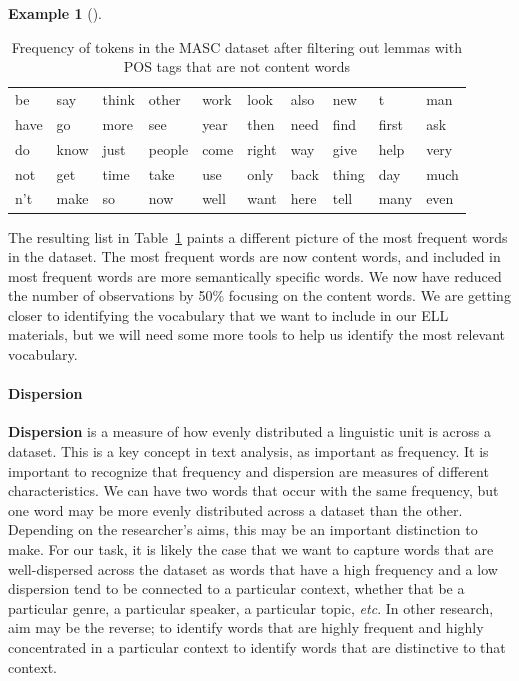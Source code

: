 \documentclass[
  letterpaper,
]{latex/krantz}
\let\oldparagraph\paragraph
\renewcommand{\paragraph}[1]{\oldparagraph{#1}\mbox{}}
\theoremstyle{definition}
\newtheorem{example}{Example}[chapter]
\theoremstyle{remark}
\begin{document}
\begin{example}[]
\begin{longtable}[]{@{}llllllllll@{}}

\caption{\label{tbl-eda-masc-filter-pos}Frequency of tokens in the MASC
dataset after filtering out lemmas with POS tags that are not content
words}

\tabularnewline

\toprule\noalign{}
\endhead
\bottomrule\noalign{}
\endlastfoot
be & say & think & other & work & look & also & new & t & man \\
have & go & more & see & year & then & need & find & first & ask \\
do & know & just & people & come & right & way & give & help & very \\
not & get & time & take & use & only & back & thing & day & much \\
n't & make & so & now & well & want & here & tell & many & even \\

\end{longtable}

\end{example}

The resulting list in Table~\ref{tbl-eda-masc-filter-pos} paints a
different picture of the most frequent words in the dataset. The most
frequent words are now content words, and included in most frequent
words are more semantically specific words. We now have reduced the
number of observations by 50\% focusing on the content words. We are
getting closer to identifying the vocabulary that we want to include in
our ELL materials, but we will need some more tools to help us identify
the most relevant vocabulary.

\paragraph{Dispersion}\label{sec-eda-frequency-dispersion}

\textbf{Dispersion} is a measure of how evenly distributed a linguistic
unit is across a dataset. This is a key concept in text analysis, as
important as frequency. It is important to recognize that frequency and
dispersion are measures of different characteristics. We can have two
words that occur with the same frequency, but one word may be more
evenly distributed across a dataset than the other. Depending on the
researcher's aims, this may be an important distinction to make. For our
task, it is likely the case that we want to capture words that are
well-dispersed across the dataset as words that have a high frequency
and a low dispersion tend to be connected to a particular context,
whether that be a particular genre, a particular speaker, a particular
topic, \emph{etc}. In other research, aim may be the reverse; to
identify words that are highly frequent and highly concentrated in a
particular context to identify words that are distinctive to that
context.
\end{document}
